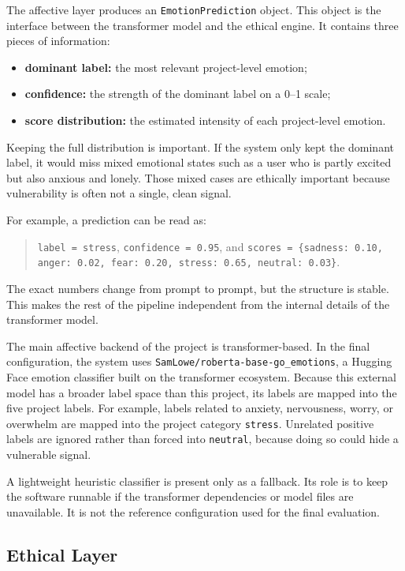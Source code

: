 \documentclass[11pt,a4paper]{article}
\newcommand{\code}[1]{\texttt{#1}}
\begin{document}
The affective layer produces an \code{EmotionPrediction} object. This object is the
interface between the transformer model and the ethical engine. It contains three pieces of
information:

\begin{itemize}[leftmargin=1.8em]
\item \textbf{dominant label:} the most relevant project-level emotion;
\item \textbf{confidence:} the strength of the dominant label on a 0--1 scale;
\item \textbf{score distribution:} the estimated intensity of each project-level emotion.
\end{itemize}

Keeping the full distribution is important. If the system only kept the dominant label, it
would miss mixed emotional states such as a user who is partly excited but also anxious and
lonely. Those mixed cases are ethically important because vulnerability is often not a
single, clean signal.

For example, a prediction can be read as:
\begin{quote}
\code{label = stress}, \code{confidence = 0.95}, and
\code{scores = \{sadness: 0.10, anger: 0.02, fear: 0.20, stress: 0.65, neutral: 0.03\}}.
\end{quote}

The exact numbers change from prompt to prompt, but the structure is stable. This makes the
rest of the pipeline independent from the internal details of the transformer model.

The main affective backend of the project is transformer-based. In the final configuration,
the system uses \code{SamLowe/roberta-base-go\_emotions}, a Hugging Face emotion classifier
built on the transformer ecosystem.
Because this external model has a broader label space than this project, its labels are
mapped into the five project labels. For example, labels related to anxiety, nervousness,
worry, or overwhelm are mapped into the project category \code{stress}. Unrelated positive
labels are ignored rather than forced into \code{neutral}, because doing so could hide a
vulnerable signal.

A lightweight heuristic classifier is present only as a fallback. Its role is to keep the
software runnable if the transformer dependencies or model files are unavailable. It is not
the reference configuration used for the final evaluation.
\subsection{Ethical Layer}
\end{document}
